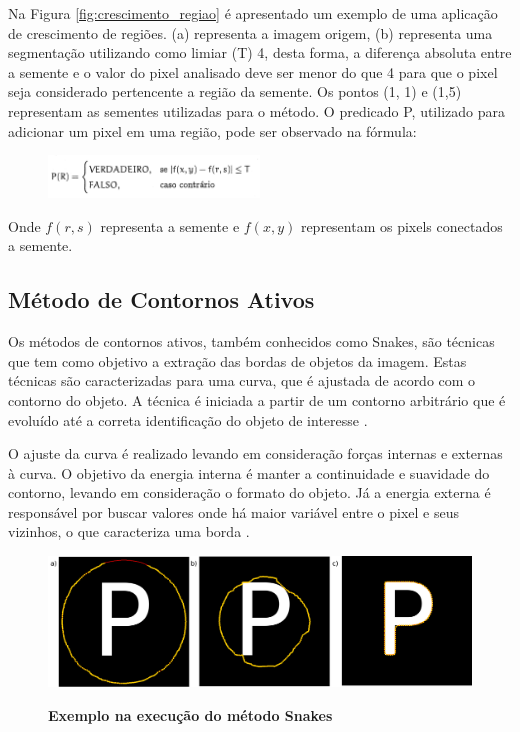\documentclass[
	12pt,				%
	oneside,			%
	a4paper,			%
	english,			%
	french,				%
	spanish,			%
	brazil,				%
	]{abntex2}
\begin{document}
Na Figura \ref{fig:crescimento_regiao} é apresentado um exemplo de uma aplicação de crescimento de regiões. (a) representa a imagem origem, (b) representa uma segmentação utilizando como limiar (T) 4, desta forma, a diferença absoluta entre a semente e o valor do pixel analisado deve ser menor do que 4 para que o pixel seja considerado pertencente a região da semente. Os pontos (1, 1) e (1,5) representam as sementes utilizadas para o método. O predicado P, utilizado para adicionar um pixel em uma região, pode ser observado na fórmula:

\begin{figure}[ht]
\centering
\includegraphics[width=0.5\textwidth]{imagens/crescimentoregiao_formula.png}
\end{figure}

Onde \(f(r,s)\) representa a semente e \(f(x, y)\) representam os pixels conectados a semente.
    
\subsection{Método de Contornos Ativos}     

Os métodos de contornos ativos, também conhecidos como Snakes, são técnicas que tem como objetivo a extração das bordas de objetos da imagem. Estas técnicas são caracterizadas para uma curva, que é ajustada de acordo com o contorno do objeto. A técnica é iniciada a partir de um contorno arbitrário que é evoluído até a correta identificação do objeto de interesse \cite{conciAzevedoLeta:2008}.

O ajuste da curva é realizado levando em consideração forças internas e externas à curva. O objetivo da energia interna é manter a continuidade e suavidade do contorno, levando em consideração o formato do objeto. Já a energia externa é responsável por buscar valores onde há maior variável entre o pixel e seus vizinhos, o que caracteriza uma borda \cite{kass:1988}.

\begin{figure}[ht]
\centering
\caption{\textbf{Exemplo na execução do método Snakes}}
\includegraphics[width=1\textwidth]{imagens/snake.png}
\sourceAuthor
\label{fig:snake}
\end{figure}
\end{document}
